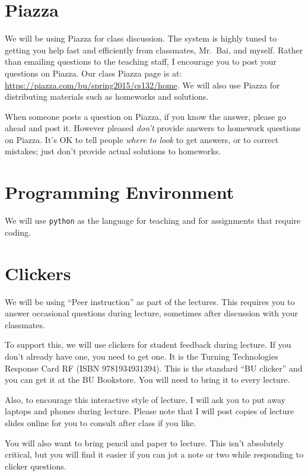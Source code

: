 \documentclass[11pt]{article}
\begin{document}
\section*{Piazza}

We will be using Piazza for class discussion. The system is highly
tuned to getting you help fast and efficiently from classmates, Mr.\ Bai,
and myself. Rather than emailing questions to the teaching staff,
I encourage you to post your questions on Piazza.   Our class Piazza
page  is at: \url{https://piazza.com/bu/spring2015/cs132/home}. 
We will also use Piazza for distributing materials
such as homeworks and solutions.

When someone posts a question on Piazza, if you know the answer, please
go ahead and post it.   However pleased \emph{don't} provide answers to homework
questions on Piazza.   It's OK to tell people \emph{where to look} to
get answers, or to correct mistakes;  just don't provide actual solutions
to homeworks.

\section*{Programming Environment}

We will use \texttt{python} as the language for teaching and for
assignments that require coding.  

\section*{Clickers}

We will be using ``Peer instruction'' as part of the lectures.  This
requires you to answer occasional questions during lecture, sometimes
after discussion with your classmates.   

To support this, we will use clickers for student feedback during lecture.  If you
don't already have one, you need to get one.  It is the Turning
Technologies Response Card RF (ISBN 9781934931394).  This is the
standard ``BU clicker'' and you can get it at
the BU Bookstore.   You will need to bring it to every lecture.

Also, to encourage this interactive style of lecture, I will ask you to
put away laptops and phones during lecture.    Please note that I will
post copies of lecture slides online for you to consult after class if
you like.

You will also want to bring pencil and paper to lecture.   This isn't
absolutely critical, but you will find it easier if you can jot a note
or two while responding to clicker questions.
\end{document}
